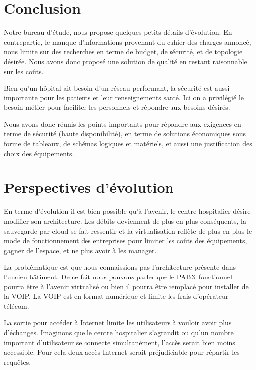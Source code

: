 \section*{Conclusion}

Notre bureau d'étude, nous propose quelques petits détails d'évolution.
En contrepartie, le manque d'informations provenant du cahier des charges annoncé, nous limite sur des recherches en terme de budget, de sécurité, et de topologie désirée.
Nous avons donc proposé une solution de qualité en restant raisonnable sur les coûts.

Bien qu'un hôpital ait besoin d'un réseau performant, la sécurité est aussi importante pour les patients et leur renseignements santé.
Ici on a privilégié le besoin métier pour faciliter les personnels et répondre aux besoins désirés.

Nous avons donc réunis les points importants pour répondre aux exigences en terme de sécurité (haute disponibilité), en terme de solutions économiques sous forme de tableaux, de schémas logiques et matériels, et aussi une justification des choix des équipements.


    \cleardoublepage{}

\section*{Perspectives d'évolution}


En terme d’évolution il est bien possible qu’à l’avenir, le centre hospitalier désire modifier son architecture. Les débits deviennent de plus en plus conséquents, la sauvegarde par cloud se fait ressentir et la virtualisation reflète de plus en plus le mode de fonctionnement des entreprises pour limiter les coûts des équipements, gagner de l’espace, et ne plus avoir à les manager.

La problématique est que nous connaissions pas l’architecture présente dans l’ancien bâtiment. De ce fait nous pouvons parler que le PABX fonctionnel pourra être à l’avenir virtualisé ou bien il pourra être remplacé pour installer de la VOIP. La VOIP est en format numérique et limite les frais d’opérateur télécom.

La sortie pour accéder à Internet limite les utilisateurs à vouloir avoir plus d’échanges. Imaginons que le centre hospitalier s'agrandit ou qu’un nombre important d’utilisateur se connecte simultanément, l’accès serait bien moins accessible. Pour cela deux accès Internet serait préjudiciable pour répartir les requêtes.

